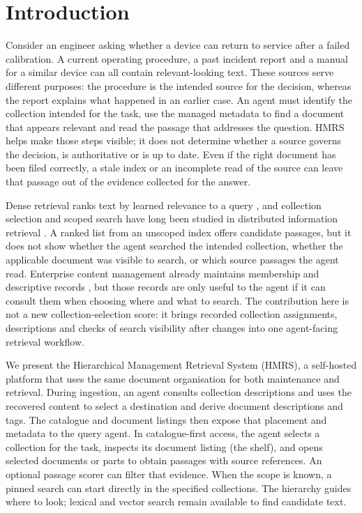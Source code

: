 \section{Introduction}
\label{sec:intro}

Consider an engineer asking whether a device can return to service after a
failed calibration. A current operating procedure, a past incident report and
a manual for a similar device can all contain relevant-looking text. These sources serve different purposes: the procedure is the intended source for the decision,
whereas the report explains what happened in an earlier case. An agent must
identify the collection intended for the task, use the managed metadata to
find a document that appears relevant and read the passage that addresses the
question. HMRS helps make those steps visible; it does not determine whether a
source governs the decision, is authoritative or is up to date. Even if the
right document has been filed correctly, a stale index or an incomplete read
of the source can leave that passage out of the evidence collected for the
answer.

Dense retrieval ranks text by learned relevance to a query \citep{dpr}, and
collection selection and scoped search have long been studied in distributed
information retrieval \citep{callan1995searching,si2003redde}. A ranked list from an unscoped
index offers candidate passages, but it does not show whether the agent
searched the intended collection, whether the applicable document was
visible to search, or which source passages the agent read. Enterprise content management already maintains
membership and descriptive records \citep{paivarinta-ecm-2005,tyrvaainen-ecm-2006},
but those records are only useful to the agent if it can consult them when
choosing where and what to search. The contribution here is not a new
collection-selection score: it brings recorded collection assignments,
descriptions and checks of search visibility after changes into one
agent-facing retrieval workflow.

We present the Hierarchical Management Retrieval System (HMRS), a self-hosted
platform that uses the same document organisation for both maintenance and
retrieval. During ingestion, an agent consults collection descriptions and
uses the recovered content to select a destination and derive document
descriptions and tags. The catalogue and document listings then expose that
placement and metadata to the query agent. In catalogue-first access, the
agent selects a collection for the task, inspects its document listing
(the shelf), and opens selected documents or parts to obtain passages with
source references. An optional passage scorer can filter that evidence.
When the scope is known, a pinned search can start directly in the specified
collections. The hierarchy guides where to look; lexical and vector search
remain available to find candidate text.

